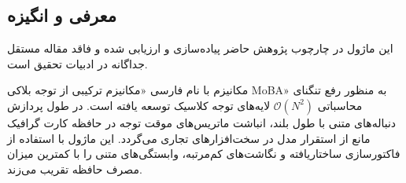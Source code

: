 \subsection{معرفی و انگیزه}
این ماژول در چارچوب پژوهش حاضر پیاده‌سازی و ارزیابی شده و فاقد مقاله مستقل جداگانه در ادبیات تحقیق است.

مکانیزم  با نام فارسی «مکانیزم ترکیبی از توجه بلاکی MoBA» به منظور رفع تنگنای محاسباتی $\mathcal{O}(N^2)$ لایه‌های توجه کلاسیک توسعه یافته است. در طول پردازش دنباله‌های متنی با طول بلند، انباشت ماتریس‌های موقت توجه در حافظه کارت گرافیک مانع از استقرار مدل در سخت‌افزارهای تجاری می‌گردد. این ماژول با استفاده از فاکتورسازی ساختاریافته و نگاشت‌های کم‌مرتبه، وابستگی‌های متنی را با کمترین میزان مصرف حافظه تقریب می‌زند.
